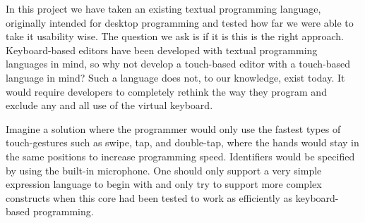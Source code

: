 In this project we have taken an existing textual programming language, originally intended for desktop programming and tested how far we were able to take it usability wise. The question we ask is if it is this is the right approach. Keyboard-based editors have been developed with textual programming languages in mind, so why not develop a touch-based editor with a touch-based language in mind? Such a language does not, to our knowledge, exist today. It would require developers to completely rethink the way they program and exclude any and all use of the virtual keyboard.

Imagine a solution where the programmer would only use the fastest types of touch-gestures such as swipe, tap, and double-tap, where the hands would stay in the same positions to increase programming speed. Identifiers would be specified by using the built-in microphone. One should only support a very simple expression language to begin with and only try to support more complex constructs when this core had been tested to work as efficiently as keyboard-based programming.

